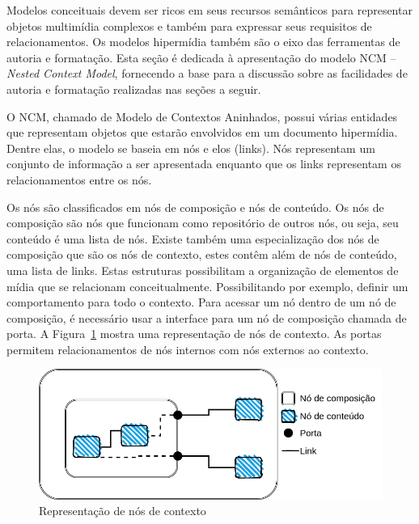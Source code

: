     Modelos conceituais devem ser ricos em seus recursos semânticos para representar objetos multimídia complexos e também para expressar seus requisitos de relacionamentos. Os modelos hipermídia também são o eixo das ferramentas de autoria e formatação. Esta seção é dedicada à apresentação do modelo NCM -- \textit{Nested Context Model}, fornecendo a base para a discussão sobre as facilidades de autoria e formatação realizadas nas seções a seguir. 

    O NCM, chamado de Modelo de Contextos Aninhados, possui várias entidades que representam objetos que estarão envolvidos em um documento hipermídia. Dentre elas, o modelo se baseia em nós e elos (links). Nós representam um conjunto de informação a ser apresentada enquanto que os links representam os relacionamentos entre os nós.

    Os nós são classificados em nós de composição e nós de conteúdo. Os nós de composição são nós que funcionam como repositório de outros nós, ou seja, seu conteúdo é uma lista de nós. Existe também uma especialização dos nós de composição que são os nós de contexto, estes contêm além de nós de conteúdo, uma lista de links. Estas estruturas possibilitam a organização de elementos de mídia  que se relacionam conceitualmente. Possibilitando por exemplo, definir um comportamento para todo o contexto. Para acessar um nó dentro de um nó de composição, é necessário usar a interface para um nó de composição chamada de porta. A Figura~\ref{fig:composicao} mostra uma representação de nós de contexto. As portas permitem relacionamentos de nós internos com nós externos ao contexto.
    
    \begin{figure}[!ht]
    \centering
    \includegraphics[scale=0.3,keepaspectratio=true]{figuras/Nocomposicao.png}
    \caption{Representação de nós de contexto \cite{Soares:2005qy}}
    \label{fig:composicao}
    \end{figure}
    
